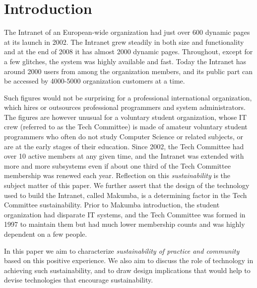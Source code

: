 \documentclass{sig-alt-release2}
\begin{document}



\section{Introduction}\label{sec:introduction}
The Intranet of an European-wide organization had just over 600 dynamic pages at its launch in 2002. The Intranet grew steadily in both size and functionality and at the end of 2008 it has almost 2000 dynamic pages. Throughout, except for a few glitches, the system was highly available and fast. Today the Intranet has around 2000 users from among the organization members, and its public part can be accessed by 4000-5000 organization customers at a time.

Such figures would not be surprising for a professional international organization, which hires or outsources professional programmers and system administrators. 
The figures are however unusual for a voluntary student organization, whose IT crew (referred to as the Tech Committee) is made of amateur voluntary student programmers who often do not study Computer Science or related subjects, or are at the early stages of their education.  
Since 2002, the Tech Committee had over 10 active members at any given time, and the Intranet was extended with more and more subsystems even if about one third of the Tech Committee membership was renewed each year. Reflection on this {\it sustainability} is the subject matter of this paper. We further assert that the design of the technology used to build the Intranet, called Makumba, is a determining factor in the Tech Committee sustainability.
Prior to Makumba introduction, the student organization had disparate IT systems, and the Tech Committee was formed in 1997 to maintain them but had much lower membership counts and was highly dependent on a few people.

In this paper we aim to characterize {\it sustainability of practice and community} based on this positive experience. We also aim to discuss the role of technology in achieving such sustainability, and to draw design implications that would help to devise technologies that encourage sustainability. 
\end{document}

